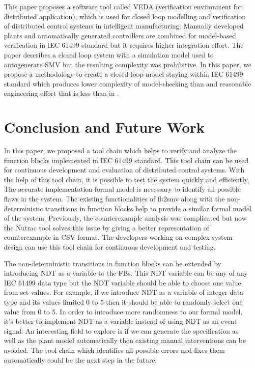 \begin{bibunit}
This paper \cite{vyatkin2003verification} proposes a software tool called VEDA (verification environment for distributed application), which is used for closed loop modelling and verification of distributed control systems in intelligent manufacturing. Manually developed plants and automatically generated controllers are combined for model-based verification in IEC 61499 standard but it requires higher integration effort. The paper \cite{Time-AwareComputations1} \cite{Time-AwareComputations2} describes a closed loop system with a simulation model used to autogenerate SMV but the resulting complexity was prohibitive. In this paper, we propose a methodology to create a closed-loop model staying within IEC 61499 standard which produces lower complexity of model-checking than \cite{Time-AwareComputations1} \cite{Time-AwareComputations2} and reasonable engineering effort that is less than in \cite{vyatkin2003verification}.  

\section{Conclusion and Future Work}\label{sec:conclusion}

In this paper, we proposed a tool chain which helps to verify and analyze the function blocks implemented in IEC 61499 standard. This tool chain can be used for continuous development and evaluation of distributed control systems. With the help of this tool chain, it is possible to test the system quickly and efficiently. The accurate implementation formal model is necessary to identify all possible flaws in the system. The existing functionalities of fb2smv along with the non-deterministic transitions in function blocks help to provide a similar formal model of the system. Previously, the counterexample analysis was complicated but now the Nutrac tool solves this issue by giving a better representation of counterexample in CSV format. The developers working on complex system design can use this tool chain for continuous development and testing.

The non-deterministic transitions in function blocks can be extended by introducing NDT as a variable to the FBs. This NDT variable can be any of any IEC 61499 data type but the NDT variable should be able to choose one value from set values. For example, if we introduce NDT as a variable of integer data type and its values limited 0 to 5 then it should be able to randomly select one value from 0 to 5. In order to introduce more randomness to our formal model, it's better to implement NDT as a variable instead of using NDT as an event signal. An interesting field to explore is if we can generate the specification as well as the plant model automatically then existing manual interventions can be avoided. The tool chain which identifies all possible errors and fixes them automatically could be the next step in the future.


\end{bibunit}
